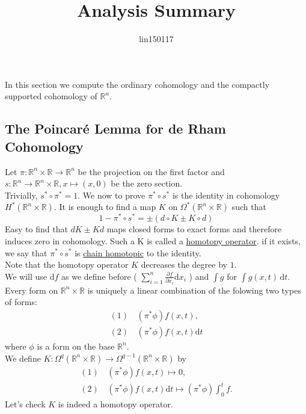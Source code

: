 \documentclass{article}
\title{Analysis Summary}
\author{lin150117 }
\date{}
\begin{document}
\setlength{\parindent}{0pt}
\setcounter{section}{4}
In this section we compute the ordinary cohomology and the compactly supported cohomology of  $ \mathbb{R}^n $.\\
\subsection{The Poincar\'{e} Lemma for de Rham Cohomology}
Let  $ \pi:\mathbb{R }^n\times \mathbb{R}\rightarrow\mathbb{R }^n  $ be the projection on the first factor and  $ s:\mathbb{R }^n\rightarrow\mathbb{R }^n\times \mathbb{R},x\mapsto (x,0) $ be the zero section.\\
Trivially,  $ s^*\circ \pi^*=1 $. We now to prove  $ \pi^*\circ s^* $ is the identity in cohomology $ H^*(\mathbb{R}^n\times \mathbb{R}) $.
It is enough to find a map  $ K  $ on  $ \Omega^*(\mathbb{R}^n\times \mathbb{R} ) $ such that 
\[1-\pi^*\circ s^*=\pm (d\circ K\pm  K\circ d)\]
Easy to find that  $ d K\pm  K d $ maps closed forms to exact forms and therefore induces zero in cohomology.
Such a K is called a \underline{homotopy operator}.\; if it exists, we say that $ \pi^*\circ s^* $ is \underline{chain homotopic} to the identity.\\
Note that the homotopy operator  $ K  $ decreases the degree by  $ 1 $.\\
We will use  $ \mathrm{d}f $ as we define before ( $ \sum\limits_{i=1}^{n}\frac{\partial f}{\partial x_i}\mathrm{d} x_i  $ ) and  $ \int g $ for  $ \int g(x,t) \, \mathrm{d}t   $.\\
Every form on  $ \mathbb{R}^n\times \mathbb{R}  $ is uniquely a linear combination of the folowing two types of forms:
\begin{align*}
    (1)\,&(\pi^*\phi)f(x,t),\\
    (2)\,&(\pi^*\phi)f(x,t)\mathrm{d}t
\end{align*}
where  $ \phi $ is a form on the base  $ \mathbb{R }^n $.\\
We define  $ K:\Omega^q(\mathbb{R}^n\times \mathbb{R} )\rightarrow\Omega^{q-1}(\mathbb{R}^n\times \mathbb{R} ) $ by
\begin{align*}
    (1)\,&(\pi^*\phi)f(x,t)\mapsto0,\\
    (2)\,&(\pi^*\phi)f(x,t)\mathrm{d} t\mapsto(\pi^*\phi)\int_{0}^{t}f.
\end{align*}
Let's check   $ K  $ is indeed a homotopy operator.\\
\end{document}
